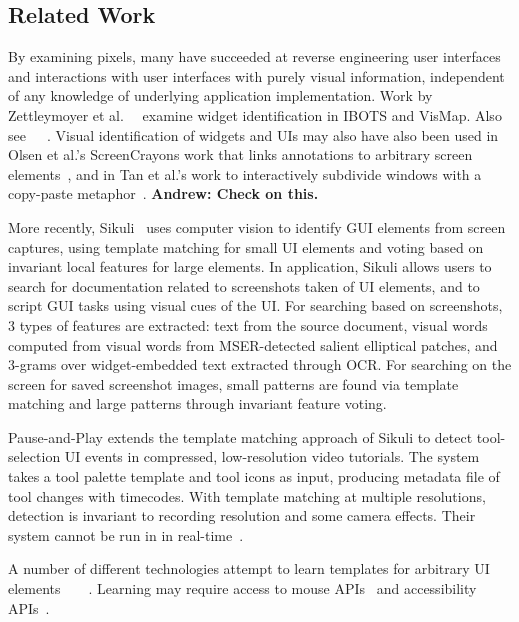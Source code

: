 \documentclass[10pt]{article}
\begin{document}
\subsection{Related Work}

By examining pixels, many have succeeded at reverse engineering user interfaces and interactions
with user interfaces with purely visual information, independent of any knowledge of underlying
application implementation. Work by Zettleymoyer et
al.~\cite{zettlemoyer_ibots_1999}~\cite{zettlemoyer_visual_1999} examine widget identification in
IBOTS and VisMap.  Also
see~\cite{potter_triggers_1992}~\cite{amant_image_2005}~\cite{lieberman_visual_2001}.  Visual
identification of widgets and UIs may also have also been used in Olsen et al.'s ScreenCrayons work
that links annotations to arbitrary screen elements~\cite{olsen_jr_implementing_1999}, and in Tan et
al.'s work to interactively subdivide windows with a copy-paste metaphor~\cite{tan_wincuts_2004}.
\textbf{Andrew: Check on this.}

More recently, Sikuli~\cite{yeh_sikuli_2009} uses computer vision to identify GUI elements from
screen captures, using template matching for small UI elements and voting based on invariant local
features for large elements.  In application, Sikuli allows users to search for documentation
related to screenshots taken of UI elements, and to script GUI tasks using visual cues of the UI.
For searching based on screenshots, 3 types of features are extracted: text from the source
document, visual words computed from visual words from MSER-detected salient elliptical patches, and
3-grams over widget-embedded text extracted through OCR.  For searching on the screen for saved
screenshot images, small patterns are found via template matching and large patterns through
invariant feature voting.

Pause-and-Play extends the template matching approach of Sikuli to detect tool-selection UI events
in compressed, low-resolution video tutorials.  The system takes a tool palette template and tool
icons as input, producing metadata file of tool changes with timecodes.  With template matching at
multiple resolutions, detection is invariant to recording resolution and some camera effects.  Their
system cannot be run in in real-time~\cite{pongnumkul_pause-and-play_2011}.

A number of different technologies attempt to learn templates for arbitrary UI
elements~\cite{chang_associating_2011}~\cite{dixon_prefab_2010}~\cite{hurst_automatically_2010}~\cite{matejka_ambient_2011}.
Learning may require access to mouse APIs~\cite{hurst_automatically_2010} and accessibility
APIs~\cite{chang_associating_2011}.
\end{document}
